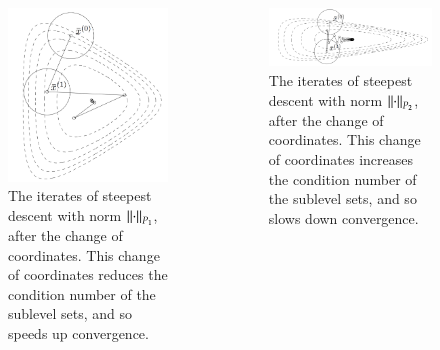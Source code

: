 \begin{frame}
{\begin{columns}
  \begin{column}{0.5\textwidth}
    \begin{figure}[bh!]
      \centering
      \includegraphics[scale=0.16]{pics/914.png}
      \caption{\tiny The iterates of steepest descent with norm $\left\lVert\cdot\right\rVert_{P_1}$, after the change of coordinates. This change of coordinates reduces the condition number of the sublevel sets, and so speeds up convergence.}
    \end{figure}
  \end{column}

  \begin{column}{0.5\textwidth}
    \begin{figure}[bh!]
      \centering
      \includegraphics[scale=0.16]{pics/915.png}
      \caption{\tiny The iterates of steepest descent with norm $\left\lVert\cdot\right\rVert_{P_2}$, after the change of coordinates. This change of coordinates increases the condition number of the sublevel sets, and so slows down convergence.}
    \end{figure}
  \end{column}
\end{columns}
}
\end{frame}
